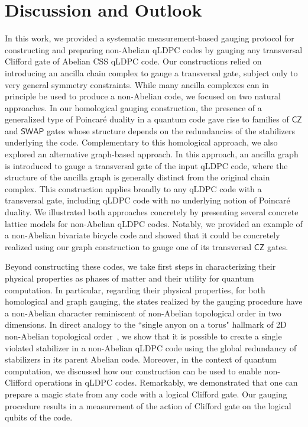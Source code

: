 \documentclass[aps,prx,reprint,superscriptaddress,nofootinbib]{revtex4-2}
\theoremstyle{definition}
\newcommand{\<}{\langle}
\renewcommand{\>}{\rangle}
\begin{document}
\section{Discussion and Outlook}

In this work, we provided a systematic measurement-based gauging protocol for constructing and preparing non-Abelian qLDPC codes by gauging any transversal Clifford gate of Abelian CSS qLDPC code.
%
Our constructions relied on introducing an ancilla chain complex to gauge a transversal gate, subject only to very general symmetry constraints. While many ancilla complexes can in principle be used to produce a non-Abelian code, we focused on two natural approaches.
%
In our homological gauging construction, the presence of a generalized type of Poincar\'e duality in a quantum code gave rise to families of $\mathsf{CZ}$ and $\mathsf{SWAP}$ gates whose structure depends on the redundancies of the stabilizers underlying the code.
%
Complementary to this homological approach, we also explored an alternative graph-based approach.
%
In this approach, an ancilla graph is introduced to gauge a transversal gate of the input qLDPC code, where the structure of the ancilla graph is generally distinct from the original chain complex.
%
This construction applies broadly to any qLDPC code with a transversal gate, including qLDPC code with no underlying notion of Poincar\'e duality.
%
We illustrated both approaches concretely by presenting several concrete lattice models for non-Abelian qLDPC codes.
%
Notably, we provided an example of a non-Abelian bivariate bicycle code and showed that it could be concretely realized using our graph construction to gauge one of its transversal $\mathsf{CZ}$ gates.

Beyond constructing these codes, we take first steps in characterizing their physical properties as phases of matter and their utility for quantum computation.
%
In particular, regarding their physical properties, for both homological and graph gauging, the states realized by the gauging procedure have a non-Abelian character reminiscent of non-Abelian topological order in two dimensions.
%
In direct analogy to the ``single anyon on a torus" hallmark of 2D non-Abelian topological order~\cite{bombin_family_2008,Iqbal_2024}, we show that it is possible to create a single violated stabilizer in a non-Abelian qLDPC code using the global redundancy of stabilizers in its parent Abelian code.
%
Moreover, in the context of quantum computation, we discussed how our construction can be used to enable non-Clifford operations in qLDPC codes.
%
Remarkably, we demonstrated that one can prepare a magic state from any code with a logical Clifford gate. Our gauging procedure results in a measurement of the action of Clifford gate on the logical qubits of the code.  
\end{document}
